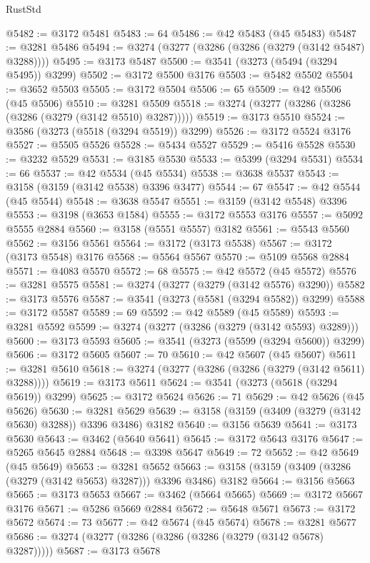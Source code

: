 \begin{lexlean}{RustStd}
\begin{coremodule}
@5482 := @3172 @5481
@5483 := 64
@5486 := @42 @5483 (@45 @5483)
@5487 := @3281 @5486
@5494 := @3274 (@3277 (@3286 (@3286 (@3279 (@3142 @5487) @3288))))
@5495 := @3173 @5487
@5500 := @3541 (@3273 (@5494 (@3294 @5495)) @3299)
@5502 := @3172 @5500 @3176
@5503 := @5482 @5502
@5504 := @3652 @5503
@5505 := @3172 @5504
@5506 := 65
@5509 := @42 @5506 (@45 @5506)
@5510 := @3281 @5509
@5518 := @3274 (@3277 (@3286 (@3286 (@3286 (@3279 (@3142 @5510) @3287)))))
@5519 := @3173 @5510
@5524 := @3586 (@3273 (@5518 (@3294 @5519)) @3299)
@5526 := @3172 @5524 @3176
@5527 := @5505 @5526
@5528 := @5434 @5527
@5529 := @5416 @5528
@5530 := @3232 @5529
@5531 := @3185 @5530
@5533 := @5399 (@3294 @5531)
@5534 := 66
@5537 := @42 @5534 (@45 @5534)
@5538 := @3638 @5537
@5543 := @3158 (@3159 (@3142 @5538) @3396 @3477)
@5544 := 67
@5547 := @42 @5544 (@45 @5544)
@5548 := @3638 @5547
@5551 := @3159 (@3142 @5548) @3396
@5553 := @3198 (@3653 @1584)
@5555 := @3172 @5553 @3176
@5557 := @5092 @5555 @2884
@5560 := @3158 (@5551 @5557) @3182
@5561 := @5543 @5560
@5562 := @3156 @5561
@5564 := @3172 (@3173 @5538)
@5567 := @3172 (@3173 @5548) @3176
@5568 := @5564 @5567
@5570 := @5109 @5568 @2884
@5571 := @4083 @5570
@5572 := 68
@5575 := @42 @5572 (@45 @5572)
@5576 := @3281 @5575
@5581 := @3274 (@3277 (@3279 (@3142 @5576) @3290))
@5582 := @3173 @5576
@5587 := @3541 (@3273 (@5581 (@3294 @5582)) @3299)
@5588 := @3172 @5587
@5589 := 69
@5592 := @42 @5589 (@45 @5589)
@5593 := @3281 @5592
@5599 := @3274 (@3277 (@3286 (@3279 (@3142 @5593) @3289)))
@5600 := @3173 @5593
@5605 := @3541 (@3273 (@5599 (@3294 @5600)) @3299)
@5606 := @3172 @5605
@5607 := 70
@5610 := @42 @5607 (@45 @5607)
@5611 := @3281 @5610
@5618 := @3274 (@3277 (@3286 (@3286 (@3279 (@3142 @5611) @3288))))
@5619 := @3173 @5611
@5624 := @3541 (@3273 (@5618 (@3294 @5619)) @3299)
@5625 := @3172 @5624
@5626 := 71
@5629 := @42 @5626 (@45 @5626)
@5630 := @3281 @5629
@5639 := @3158 (@3159 (@3409 (@3279 (@3142 @5630) @3288)) @3396 @3486) @3182
@5640 := @3156 @5639
@5641 := @3173 @5630
@5643 := @3462 (@5640 @5641)
@5645 := @3172 @5643 @3176
@5647 := @5265 @5645 @2884
@5648 := @3398 @5647
@5649 := 72
@5652 := @42 @5649 (@45 @5649)
@5653 := @3281 @5652
@5663 := @3158 (@3159 (@3409 (@3286 (@3279 (@3142 @5653) @3287))) @3396 @3486) @3182
@5664 := @3156 @5663
@5665 := @3173 @5653
@5667 := @3462 (@5664 @5665)
@5669 := @3172 @5667 @3176
@5671 := @5286 @5669 @2884
@5672 := @5648 @5671
@5673 := @3172 @5672
@5674 := 73
@5677 := @42 @5674 (@45 @5674)
@5678 := @3281 @5677
@5686 := @3274 (@3277 (@3286 (@3286 (@3286 (@3279 (@3142 @5678) @3287)))))
@5687 := @3173 @5678

\end{coremodule}
\end{lexlean}
